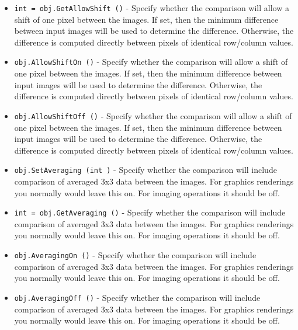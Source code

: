 \begin{itemize}
\item  \verb|int = obj.GetAllowShift ()| -  Specify whether the comparison will allow a shift of one
 pixel between the images.  If set, then the minimum difference
 between input images will be used to determine the difference.
 Otherwise, the difference is computed directly between pixels
 of identical row/column values.

\item  \verb|obj.AllowShiftOn ()| -  Specify whether the comparison will allow a shift of one
 pixel between the images.  If set, then the minimum difference
 between input images will be used to determine the difference.
 Otherwise, the difference is computed directly between pixels
 of identical row/column values.

\item  \verb|obj.AllowShiftOff ()| -  Specify whether the comparison will allow a shift of one
 pixel between the images.  If set, then the minimum difference
 between input images will be used to determine the difference.
 Otherwise, the difference is computed directly between pixels
 of identical row/column values.

\item  \verb|obj.SetAveraging (int )| -  Specify whether the comparison will include comparison of
 averaged 3x3 data between the images. For graphics renderings
 you normally would leave this on. For imaging operations it
 should be off.

\item  \verb|int = obj.GetAveraging ()| -  Specify whether the comparison will include comparison of
 averaged 3x3 data between the images. For graphics renderings
 you normally would leave this on. For imaging operations it
 should be off.

\item  \verb|obj.AveragingOn ()| -  Specify whether the comparison will include comparison of
 averaged 3x3 data between the images. For graphics renderings
 you normally would leave this on. For imaging operations it
 should be off.

\item  \verb|obj.AveragingOff ()| -  Specify whether the comparison will include comparison of
 averaged 3x3 data between the images. For graphics renderings
 you normally would leave this on. For imaging operations it
 should be off.

\end{itemize}
